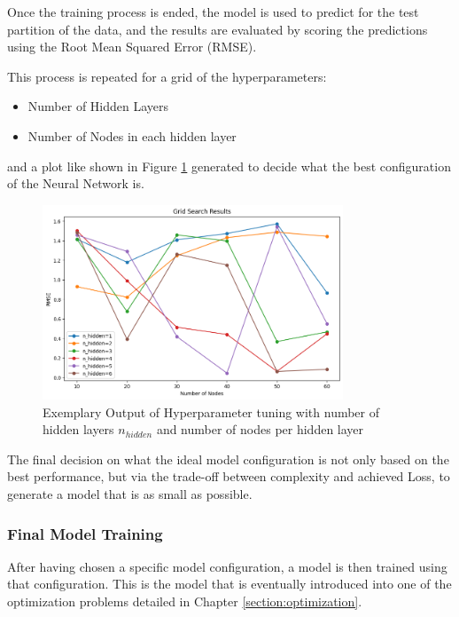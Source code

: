 Once the training process is ended, the model is used to predict for the test partition of the data, and the results are evaluated by scoring the predictions using the Root Mean Squared Error (RMSE). 

This process is repeated for a grid of the hyperparameters:
\begin{itemize}
	\item Number of Hidden Layers
	\item Number of Nodes in each hidden layer
\end{itemize}

and a plot like shown in Figure	\ref{fig:hyperparm} generated to decide what the best configuration of the Neural Network is. 

\begin{figure}[h] 
	\centering
	\includegraphics[width=0.8\textwidth]{../figures/modelling/hyperparm.png} 
	\caption{Exemplary Output of Hyperparameter tuning with number of hidden layers $n_{hidden} $ and number of nodes per hidden layer}
	\label{fig:hyperparm}
\end{figure}

The final decision on what the ideal model configuration is not only based on the best performance, but via the trade-off between complexity and achieved Loss, to generate a model that is as small as possible.


\subsubsection{Final Model Training}

After having chosen a specific model configuration, a model is then trained using that configuration. This is the model that is eventually introduced into one of the optimization problems detailed in Chapter \ref{section:optimization}.

